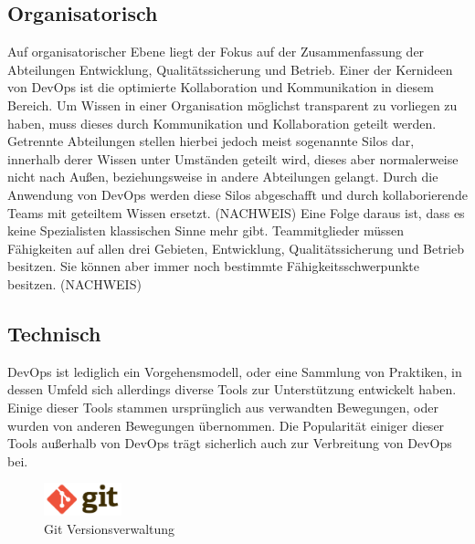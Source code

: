 \subsection{Organisatorisch}
Auf organisatorischer Ebene liegt der Fokus auf der Zusammenfassung der Abteilungen Entwicklung, Qualitätssicherung und Betrieb. Einer der Kernideen von DevOps ist die optimierte Kollaboration und Kommunikation in diesem Bereich. Um Wissen in einer Organisation möglichst transparent zu vorliegen zu haben, muss dieses durch Kommunikation und Kollaboration geteilt werden. Getrennte Abteilungen stellen hierbei jedoch meist sogenannte Silos dar, innerhalb derer Wissen unter Umständen geteilt wird, dieses aber normalerweise nicht nach Außen, beziehungsweise in andere Abteilungen gelangt. Durch die Anwendung von DevOps werden diese Silos abgeschafft und durch kollaborierende Teams mit geteiltem Wissen ersetzt. (NACHWEIS)
Eine Folge daraus ist, dass es keine Spezialisten klassischen Sinne mehr gibt. Teammitglieder müssen Fähigkeiten auf allen drei Gebieten, Entwicklung, Qualitätssicherung und Betrieb besitzen. Sie können aber immer noch bestimmte Fähigkeitsschwerpunkte besitzen. (NACHWEIS)

\subsection{Technisch}
DevOps ist lediglich ein Vorgehensmodell, oder eine Sammlung von Praktiken, in dessen Umfeld sich allerdings diverse Tools zur Unterstützung entwickelt haben. Einige dieser Tools stammen ursprünglich aus verwandten Bewegungen, oder wurden von anderen Bewegungen übernommen. Die Popularität einiger dieser Tools außerhalb von DevOps trägt sicherlich auch zur Verbreitung von DevOps bei.\\

\begin{figure}[ht]
  \centering
  \includegraphics[width=0.2\textwidth]{img/git_logo.png}
  \caption{Git Versionsverwaltung \parencite[][]{Git:2016}}
  \label{fig:scrummodell}
\end{figure}


